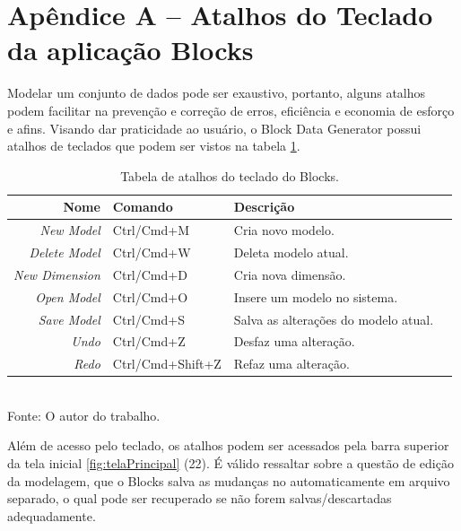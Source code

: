 \documentclass[
	12pt,				%
	openright,			%
	oneside,			%
	a4paper,			%
	english,			%
	brazil				%
	]{abntex2}
\begin{document}
\chapter*{Apêndice A -- Atalhos do Teclado da aplicação Blocks}
			Modelar um conjunto de dados pode ser exaustivo, portanto, alguns atalhos podem facilitar na prevenção e correção de erros, eficiência e economia de esforço e afins.
			Visando dar praticidade ao usuário, o Block Data Generator possui atalhos de teclados que podem ser vistos na tabela \ref{table: comandos do teclado}.
				\begin{table}[h]
					\centering
					\caption{Tabela de atalhos do teclado do Blocks.}
					\vspace{0.5cm}
					\label{table: comandos do teclado}
					\begin{tabular}{r|lll}
					
						Nome                 & Comando          & Descrição                           \\ %
						\hline                                  %
						\emph{New Model}     & Ctrl/Cmd+M       & Cria novo modelo.                   \\
						\emph{Delete Model}  & Ctrl/Cmd+W       & Deleta modelo atual.                \\
						\emph{New Dimension} & Ctrl/Cmd+D       & Cria nova dimensão.                 \\
						\emph{Open Model}    & Ctrl/Cmd+O       & Insere um modelo no sistema.        \\
						\emph{Save Model}    & Ctrl/Cmd+S       & Salva as alterações do modelo atual.\\
						\emph{Undo}          & Ctrl/Cmd+Z       & Desfaz uma alteração.               \\
						\emph{Redo}          & Ctrl/Cmd+Shift+Z & Refaz uma alteração.                \\
			
					\end{tabular}
					\bigskip
					\\
					\footnotesize Fonte: O autor do trabalho.
				\end{table}
			\par
			
			Além de acesso pelo teclado, os atalhos podem ser acessados pela barra superior da tela inicial \ref{fig:telaPrincipal} (22).
			É válido ressaltar sobre a questão de edição da modelagem, que o Blocks salva as mudanças no automaticamente em arquivo separado, o qual pode ser recuperado se não forem salvas/descartadas adequadamente.
\end{document}

